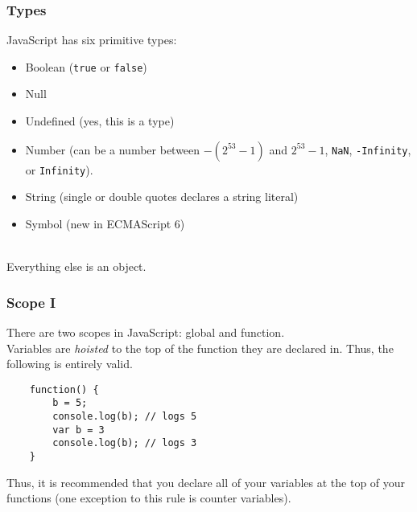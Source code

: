 \documentclass{lug}
\begin{document}
\begin{frame}
    \frametitle{Types\footnotemark[1]}

    JavaScript has six primitive types:

    \begin{itemize}
        \item Boolean (\texttt{true} or \texttt{false})
        \item Null
        \item Undefined (yes, this is a type)
        \item Number (can be a number between $-(2^{53} - 1)$ and $2^{53} - 1$, \texttt{NaN},
            \texttt{-Infinity}, or \texttt{Infinity}).
        \item String (single or double quotes declares a string literal\footnotemark[2])
        \item Symbol (new in ECMAScript 6)
    \end{itemize}

    ~\\
    Everything else is an object.

\end{frame}

\begin{frame}[fragile]
    \frametitle{Scope I}

    There are two scopes in JavaScript: global and function.\footnotemark[1]\\

    Variables are \textit{hoisted} to the top of the function they are declared in. Thus, the
    following is entirely valid.

    \begin{lstlisting}
    function() {
        b = 5;
        console.log(b); // logs 5
        var b = 3
        console.log(b); // logs 3
    }
    \end{lstlisting}

    Thus, it is recommended that you declare all of your variables at the top of your
    functions (one exception to this rule is counter variables).

\end{frame}
\end{document}
